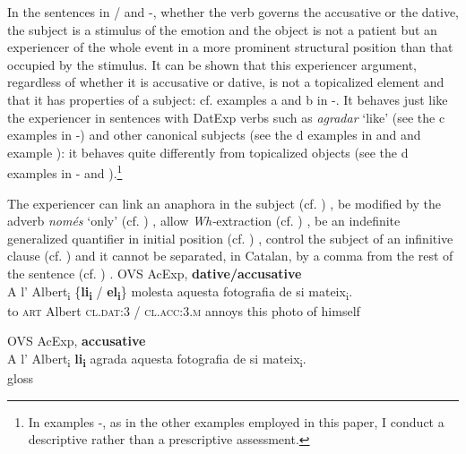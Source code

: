 \documentclass[output=paper,colorlinks,citecolor=brown,modfonts,nonflat]{langsci/langscibook}
\begin{document}
In the sentences in / and -, whether the verb governs the accusative or the dative, the subject is a stimulus of the emotion and the object is not a patient but an experiencer of the whole event in a more prominent structural position than that occupied by the stimulus. It can be shown that this experiencer argument, regardless of whether it is accusative or dative, is not a topicalized element and that it has properties of a subject: cf. examples {a} and {b} in -. It behaves just like the experiencer in sentences with DatExp verbs such as \textit{agradar} ‘like’ (see the {c} examples in -) and other canonical subjects (see the {d} examples in  and  and example ): it behaves quite differently from topicalized objects (see the {d} examples in - and ).\footnote{In examples -, as in the other examples employed in this paper, I conduct a descriptive rather than a prescriptive assessment.}

The experiencer can link an anaphora in the subject (cf. \citealt{Demonte1995, EgurenFernándezSoriano2004}) , be modified by the adverb \textit{només} ‘only’ (cf. \citealt{Cuervo1999}) , allow \textit{Wh-}extraction (cf. \citealt{BellettiRizzi1988}) , be an indefinite generalized quantifier in initial position (cf. \citealt{BellettiRizzi1988, Masullo1992quirky, Cuervo1999}) , control the subject of an infinitive clause (cf. \citealt{Campos1999, Alsina2008})  and it cannot be separated, in Catalan, by a comma from the rest of the sentence (cf. \citealt{Ginebra2003, Ginebra2005}) .
\textbf{}
\ea%
 \label{ex:royo:8}
 \ea OVS AcExp, \textbf{dative/accusative} \label{ex:royo:8a}\\
 \gll A l’ Albert\textsubscript{i} \{\textbf{li\textsubscript{i}} / \textbf{el\textsubscript{i}}\} molesta aquesta fotografia de si mateix\textsubscript{i}.\\
  to \textsc{art} Albert {\textsc{cl.dat:3}} / {\textsc{cl.acc:3.m}} annoys this photo of himself\\
\glt {}
 
  
 \ex OVS AcExp, \textbf{accusative}\label{ex:royo:8c}\\
 \gll A l’ Albert\textsubscript{i} \textbf{li\textsubscript{i}} agrada aquesta fotografia de si mateix\textsubscript{i}.\\
gloss\\
\glt {}
\end{document}
